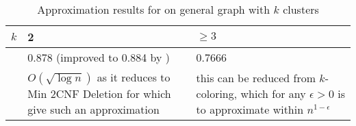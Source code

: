 \begin{table}[htpb]
   \centering
   \caption{Approximation results for \pcc{} on general graph with $k$ clusters} \label{tab:cc_fixed}
   \begin{tabulary}{187mm}{lLL}
      \toprule
      $k$	 & 2 & $\geq 3$ \\
      \midrule
      \maxa{} & 0.878 (improved to 0.884 by \autocite{Mitra2009}) & 0.7666 \autocite{Swamy2004} \\
      \mind{} & $O(\sqrt{\log n})$ as it reduces to Min 2CNF Deletion for which \textcite{min2CNF05}
      give such an approximation &
      this can be reduced from $k$-coloring, which for any $\epsilon > 0$ is \NPc{} to approximate
      within $n^{1-\epsilon}$ \autocite{InnaproxChroma07} \\
      \bottomrule
   \end{tabulary}
\end{table}
